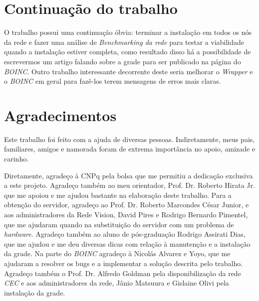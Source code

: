 \section{Continuação do trabalho}

O trabalho possui uma continuação óbvia: terminar a instalação em todos os nós da rede e fazer uma análise de \emph{Benchmarking da rede} para
testar a viabilidade quando a instalação estiver completa, como resultado disso há a possibilidade de
escrevermos um artigo falando sobre a grade para ser publicado na página do \emph{BOINC}. Outro trabalho interessante decorrente deste 
seria melhorar o \emph{Wrapper} e o \emph{BOINC} em geral para fazê-los terem mensagens de erros mais claras. 

\section{Agradecimentos}

Este trabalho foi feito com a ajuda de diversas pessoas. Indiretamente, meus pais, familiares, amigos e namorada foram de extrema importância 
no apoio, amizade e carinho. 

Diretamente, agradeço à CNPq pela bolsa que me permitiu a dedicação exclusiva a este projeto. Agradeço também ao meu orientador, 
Prof. Dr. Roberto Hirata Jr. que me apoiou e me ajudou bastante na elaboração deste trabalho. Para a obtenção do servidor,
agradeço ao Prof. Dr. Roberto Marcondes César Junior, e aos administradores da Rede Vision, David Pires e Rodrigo Bernardo Pimentel, 
que me ajudaram quando na substituição do servidor com um problema de \emph{hardware}. Agradeço também ao aluno de pós-graduação
Rodrigo Assirati Dias, que me ajudou e me deu diversas dicas com relação à manutenção e a instalação da grade. Na parte do \emph{BOINC}
agradeço à Nicolás Alvarez e Yoyo, que me ajudaram a resolver os bugs e a implementar a solução descrita pelo trabalho. Agradeço também 
o Prof. Dr. Alfredo Goldman pela disponibilização da rede \emph{CEC} e aos administradores da rede, Jânio Matsuura e Gislaine Olivi
pela instalação da grade.



